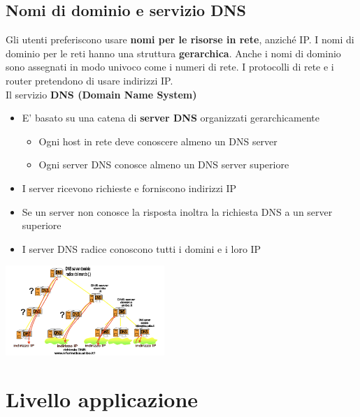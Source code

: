 \documentclass{article}
\begin{document}
\subsection{Nomi di dominio e servizio DNS}
Gli utenti preferiscono usare \textbf{nomi per le risorse in rete}, anziché IP. I nomi di dominio per le reti hanno una struttura \textbf{gerarchica}. Anche i nomi di dominio sono assegnati in modo univoco come i numeri di rete. I protocolli di rete e i router pretendono di usare indirizzi IP.\\
Il servizio \textbf{DNS (Domain Name System)}
\begin{itemize}
    \item E' basato su una catena di \textbf{server DNS} organizzati gerarchicamente
    \begin{itemize}
        \item Ogni host in rete deve conoscere almeno un DNS server
        \item Ogni server DNS conosce almeno un DNS server superiore
    \end{itemize}
    \item I server ricevono richieste e forniscono indirizzi IP
    \item Se un server non conosce la risposta inoltra la richiesta DNS a un server superiore
    \item I server DNS radice conoscono tutti i domini e i loro IP
\end{itemize}
\begin{center}
    \includegraphics[width=6cm]{img/dns.png}
\end{center}

\section{Livello applicazione}
\end{document}
